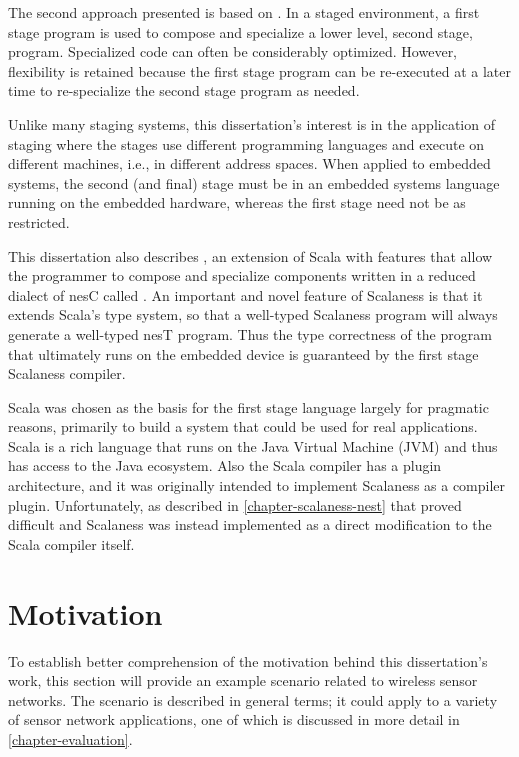 The second approach presented is based on 
\cite{Taha-MetaML,Sheard-TemplateHaskell,Mainland-Flask-2008,FramedML}. In a staged environment,
a first stage program is used to compose and specialize a lower level, second stage, program.
Specialized code can often be considerably optimized. However, flexibility is retained because
the first stage program can be re-executed at a later time to re-specialize the second stage
program as needed.

Unlike many staging systems, this dissertation's interest is in the application of staging where
the stages use different programming languages and execute on different machines, i.e., in
different address spaces. When applied to embedded systems, the second (and final) stage must be
in an embedded systems language running on the embedded hardware, whereas the first stage need
not be as restricted.

This dissertation also describes  \cite{chapin-GPCE-2013}, an extension of
Scala \cite{PiS2} with features that allow the programmer to compose and specialize components
written in a reduced dialect of nesC called . An important and novel feature of
Scalaness is that it extends Scala's type system, so that a well-typed Scalaness program will
always generate a well-typed nesT program. Thus the type correctness of the program that
ultimately runs on the embedded device is guaranteed by the first stage Scalaness compiler.

Scala was chosen as the basis for the first stage language largely for pragmatic reasons,
primarily to build a system that could be used for real applications. Scala is a rich language
that runs on the Java Virtual Machine (JVM) and thus has access to the Java ecosystem. Also the
Scala compiler has a plugin architecture, and it was originally intended to implement Scalaness
as a compiler plugin. Unfortunately, as described in \autoref{chapter-scalaness-nest} that
proved difficult and Scalaness was instead implemented as a direct modification to the Scala
compiler itself.

\section{Motivation}

To establish better comprehension of the motivation behind this dissertation's work, this
section will provide an example scenario related to wireless sensor networks. The scenario is
described in general terms; it could apply to a variety of sensor network applications, one of
which is discussed in more detail in \autoref{chapter-evaluation}.


